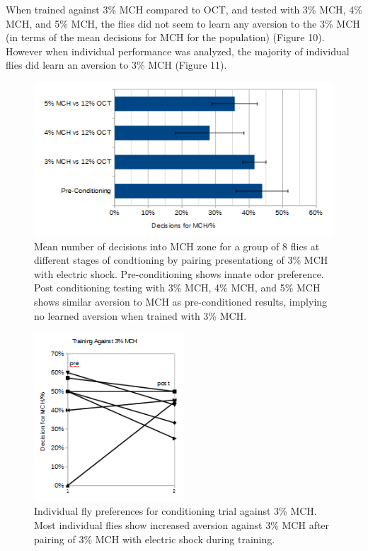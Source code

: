 \documentclass{article}
\begin{document}
When trained against 3\% MCH compared to OCT, and tested with 3\% MCH, 4\% MCH, and 5\% MCH, the flies did not seem to learn any aversion to the 3\% MCH (in terms of the mean decisions for MCH for the population) (Figure 10). However when individual performance was analyzed, the majority of individual flies did learn an aversion to 3\% MCH (Figure 11).


\begin{figure}[h]
\begin{center}
\includegraphics[width=1\textwidth]{Figures/3_MCH_up_conc}
\caption{Mean number of decisions into MCH zone for a group of 8 flies at different stages of condtioning by pairing presentationg of 3\% MCH with electric shock. Pre-conditioning shows innate odor preference. Post conditioning testing with 3\% MCH, 4\% MCH, and 5\% MCH shows similar aversion to MCH as pre-conditioned results, implying no learned aversion when trained with 3\% MCH.}
\end{center}
\end{figure}

\begin{figure}[h]
\begin{center}
\includegraphics[width=0.5\textwidth]{Figures/individual_3}
\caption{Individual fly preferences for conditioning trial against 3\% MCH. Most individual flies show increased aversion against 3\% MCH after pairing of 3\% MCH with electric shock during training.}
\end{center}
\end{figure}
\end{document}
